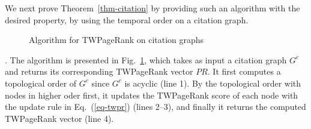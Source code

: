 {We next prove Theorem~\ref{thm-citation} by providing such an algorithm with the desired property, by using the temporal order on a citation graph.





\begin{figure}[tb!]
\begin{center}
{\small
\begin{minipage}{3.36in}
\myhrule \vspace{-2ex}
\vspace{-3ex} \myhrule
\end{minipage}
}
\end{center}
\vspace{-3ex}
\caption{\small Algorithm for TWPageRank on citation graphs} \label{alg-TWPageRank-citation}
\vspace{-3ex}
\end{figure}






. The algorithm is presented in Fig.~\ref{alg-TWPageRank-citation}, which takes as input a citation graph $G^c$ and returns its corresponding TWPageRank vector $PR$. It first computes a topological order of $G^c$ since $G^c$ is acyclic (line 1).
By the topological order with nodes in higher oder first, it updates the TWPageRank score of each node with the update rule in Eq.~(\ref{eq-twpr}) (lines 2--3), and finally  it returns the computed TWPageRank vector (line 4).


}
